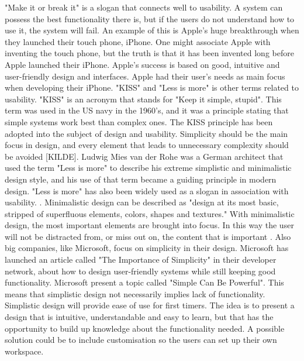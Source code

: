 "Make it or break it" is a slogan that connects well to usability. A system can possess the best functionality there is, but if the users do not understand how to use it, the system will fail. An example of this is Apple's huge breakthrough when they launched their touch phone, iPhone. One might associate Apple with inventing the touch phone, but the truth is that it has been invented long before Apple launched their iPhone. Apple’s success is based on good, intuitive and user-friendly design and interfaces. Apple had their user’s needs as main focus when developing their iPhone. "KISS" and "Less is more" is other terms related to usability. "KISS" is an acronym that stands for "Keep it simple, stupid". This term was used in the US navy in the 1960's, and it was a principle stating that simple systems work best than complex ones. The KISS principle has been adopted into the subject of design and usability. Simplicity should be the main focus in design, and every element that leads to unnecessary complexity should be avoided [KILDE]. Ludwig Mies van der Rohe was a German architect that used the term "Less is more" to describe his extreme simplistic and minimalistic design style, and his use of that term became a guiding principle in modern design. "Less is more" has also been widely used as a slogan in association with usability. \cite{rohe}. Minimalistic design can be described as "design at its most basic, stripped of superfluous elements, colors, shapes and textures." With minimalistic design, the most important elements are brought into focus. In this way the user will not be distracted from, or miss out on, the content that is important \cite{lessismore}. Also big companies, like Microsoft, focus on simplicity in their design. Microsoft has launched an article called "The Importance of Simplicity" in their developer network, about how to design user-friendly systems while still keeping good functionality. Microsoft present a topic called "Simple Can Be Powerful". This means that simplistic design not necessarily implies lack of functionality. Simplistic design will provide ease of use for first timers. The idea is to present a design that is intuitive, understandable and easy to learn, but that has the opportunity to build up knowledge about the functionality needed. A possible solution could be to include customisation so the users can set up their own workspace.             

